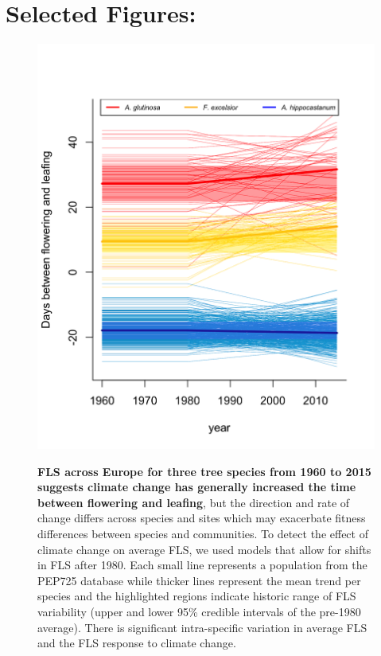 \documentclass[10.5pt,a4paper]{article}
\begin{document}
\section*{Selected Figures:}
   \begin{figure}[ht!]
   \centering
 \includegraphics[width=.6\textwidth]{..//figure/FLS_climate_change.png}\\
\caption{\textbf{FLS across Europe for three tree species from 1960 to 2015 suggests climate change has generally increased the time between flowering and leafing}, but the direction and rate of change differs across species and sites which may exacerbate fitness differences between species and communities. To detect the effect of climate change on average FLS, we used models that allow for shifts in FLS after 1980. Each small line represents a population from the PEP725 database while thicker lines represent the mean trend per species and the highlighted regions indicate historic range of FLS variability (upper and lower 95\% credible intervals of the pre-1980 average). There is significant intra-specific variation in average FLS and the FLS response to climate change.}
    \label{fig:Figure 1}
    \end{figure}
\newpage

\end{document}
